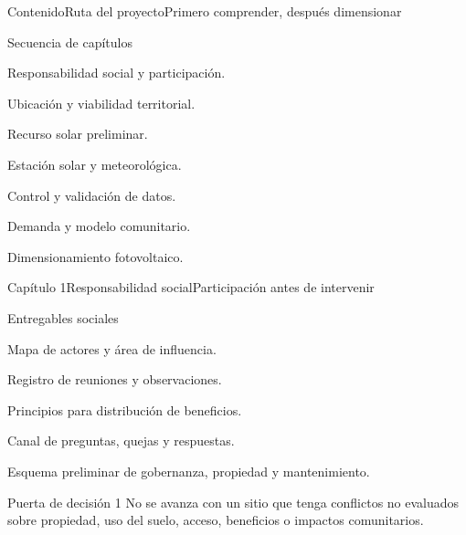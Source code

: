 \documentclass{../plantilla/hvtbook}
\begin{document}
\HVTMakeTitle

\begin{HVTPage}{Contenido}{Ruta del proyecto}{Primero comprender, después dimensionar}
\begin{HVTTaskOrdered}{Secuencia de capítulos}
  \item Responsabilidad social y participación.
  \item Ubicación y viabilidad territorial.
  \item Recurso solar preliminar.
  \item Estación solar y meteorológica.
  \item Control y validación de datos.
  \item Demanda y modelo comunitario.
  \item Dimensionamiento fotovoltaico.
\end{HVTTaskOrdered}
\end{HVTPage}

\begin{HVTPage}{Capítulo 1}{Responsabilidad social}{Participación antes de intervenir}
\begin{HVTFlow}
\end{HVTFlow}
\begin{HVTTask}{Entregables sociales}
  \item Mapa de actores y área de influencia.
  \item Registro de reuniones y observaciones.
  \item Principios para distribución de beneficios.
  \item Canal de preguntas, quejas y respuestas.
  \item Esquema preliminar de gobernanza, propiedad y mantenimiento.
\end{HVTTask}
\begin{HVTWarning}{Puerta de decisión 1}
No se avanza con un sitio que tenga conflictos no evaluados sobre propiedad, uso del suelo, acceso, beneficios o impactos comunitarios.
\end{HVTWarning}
\end{HVTPage}
\end{document}

